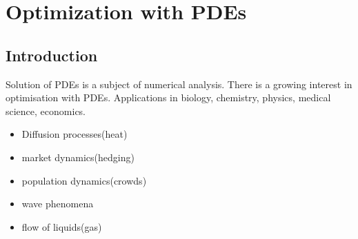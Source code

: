 \documentclass[a4paper,11pt,fleqn]{book}
\theoremstyle{definition}
\theoremstyle{remark}
\begin{document}
\chapter{Optimization with PDEs}
\section{Introduction}
Solution of PDEs is a subject of numerical analysis. There is a growing interest in optimisation with PDEs. Applications in biology, chemistry, physics, medical science, economics. 
\begin{itemize}
	\item Diffusion processes(heat)
	\item market dynamics(hedging)
	\item population dynamics(crowds)
	\item wave phenomena
	\item flow of liquids(gas)
\end{itemize}
\end{document}
